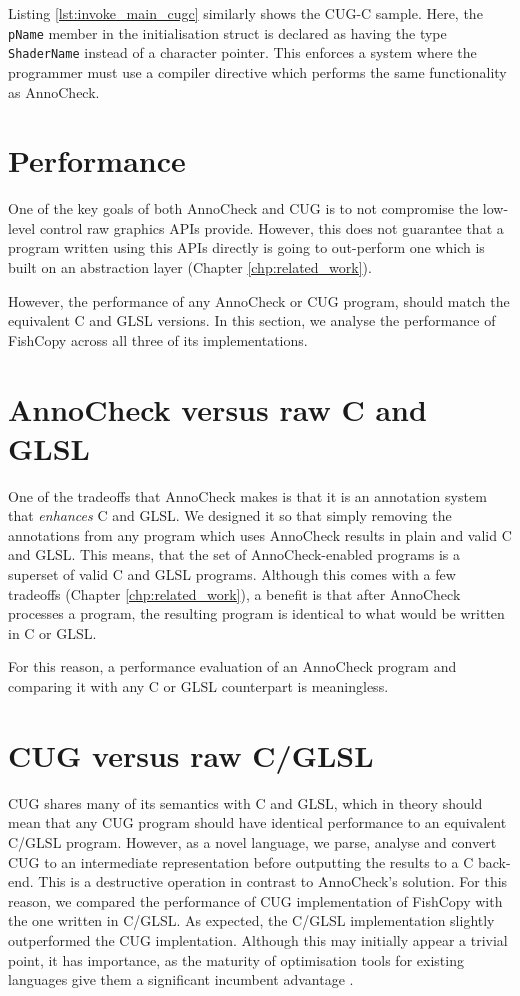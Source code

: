 \documentclass[a4paper,12pt,twoside,openright]{report}
\begin{document}
Listing \ref{lst:invoke_main_cugc} similarly shows the CUG-C sample. Here, the
\texttt{pName} member in the initialisation struct is declared as having the
type \texttt{ShaderName} instead of a character pointer. This enforces a system
where the programmer must use a compiler directive which performs the same
functionality as AnnoCheck.

\section{Performance}

One of the key goals of both AnnoCheck and CUG is to not compromise the
low-level control raw graphics APIs provide. However, this does not guarantee
that a program written using this APIs directly is going to out-perform one
which is built on an abstraction layer (Chapter \ref{chp:related_work}).

However, the performance of any AnnoCheck or CUG program, should match the
equivalent C and GLSL versions. In this section, we analyse the performance of
FishCopy across all three of its implementations.

\section{AnnoCheck versus raw C and GLSL}


One of the tradeoffs that AnnoCheck makes is that it is an annotation system
that \textit{enhances} C and GLSL. We designed it so that simply removing the
annotations from any program which uses AnnoCheck results in plain and valid C
and GLSL. This means, that the set of AnnoCheck-enabled programs is a superset
of valid C and GLSL programs. Although this comes with a few tradeoffs (Chapter
\ref{chp:related_work}), a benefit is that after AnnoCheck processes a program,
the resulting program is identical to what would be written in C or GLSL.

For this reason, a performance evaluation of an AnnoCheck program and comparing
it with any C or GLSL counterpart is meaningless. %

\section{CUG versus raw C/GLSL}

CUG shares many of its semantics with C and GLSL, which in theory should mean
that any CUG program should have identical performance to an equivalent C/GLSL
program. However, as a novel language, we parse, analyse and convert CUG to an
intermediate representation before outputting the results to a C back-end. This
is a destructive operation in contrast to AnnoCheck's solution. For this
reason, we compared the performance of CUG implementation of FishCopy with the
one written in C/GLSL. As expected, the C/GLSL implementation slightly
outperformed the CUG implentation. Although this may initially appear a trivial
point, it has importance, as the maturity of optimisation tools for existing
languages give them a significant incumbent advantage \cite{RustSlow}.
\end{document}
